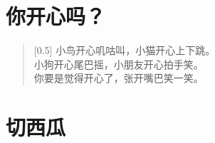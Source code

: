 \documentclass[12pt,UTF-8,openany]{ctexbook}
\begin{document}
\hanzibox{}\hanzibox{}\hanzibox{}\hanzibox{}\hspace{1em}\hanzibox{}\hanzibox{}\hanzibox{}\hanzibox{}

\hanzibox{}\hanzibox{}\hanzibox{}\hanzibox{}\hspace{1em}\hanzibox{}\hanzibox{}\hanzibox{}\hanzibox{}

\hanzibox{}\hanzibox{}\hanzibox{}\hanzibox{}\hspace{1em}\hanzibox{}\hanzibox{}\hanzibox{}\hanzibox{}






\chapter{你开心吗？}

\begin{large}
    
    \begin{verse}[0.5\linewidth]
        小鸟开心叽咕叫，小猫开心上下跳。 \\
        小狗开心尾巴摇，小朋友开心拍手笑。 \\
        你要是觉得开心了，张开嘴巴笑一笑。
    \end{verse}
    
\end{large}


\clearpage

\begin{center}
    
\end{center}


\hanzibox{}\hanzibox{}\hanzibox{}\hanzibox{}\hspace{1em}\hanzibox{}\hanzibox{}\hanzibox{}\hanzibox{}

\hanzibox{}\hanzibox{}\hanzibox{}\hanzibox{}\hspace{1em}\hanzibox{}\hanzibox{}\hanzibox{}\hanzibox{}

\hanzibox{}\hanzibox{}\hanzibox{}\hanzibox{}\hspace{1em}\hanzibox{}\hanzibox{}\hanzibox{}\hanzibox{}






\chapter{切西瓜}
\end{document}
